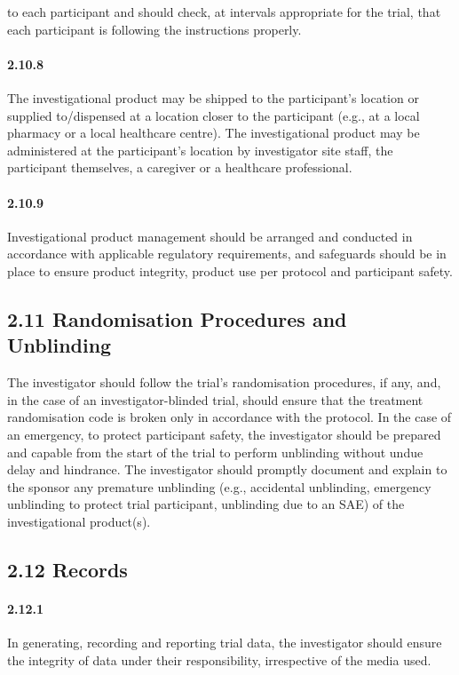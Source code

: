 \documentclass[11pt]{article}
\begin{document}
to each participant and should check, at intervals appropriate for the trial, that each participant is following the instructions properly.


\paragraph{2.10.8} The investigational product may be shipped to the participant's location or supplied to/dispensed at a location closer to the participant (e.g., at a local pharmacy or a local healthcare centre). The investigational product may be administered at the participant's location by investigator site staff, the participant themselves, a caregiver or a healthcare professional.

\paragraph{2.10.9} Investigational product management should be arranged and conducted in accordance with applicable regulatory requirements, and safeguards should be in place to ensure product integrity, product use per protocol and participant safety.

\subsection{2.11 Randomisation Procedures and Unblinding}

The investigator should follow the trial's randomisation procedures, if any, and, in the case of an investigator-blinded trial, should ensure that the treatment randomisation code is broken only in accordance with the protocol. In the case of an emergency, to protect participant safety, the investigator should be prepared and capable from the start of the trial to perform unblinding without undue delay and hindrance. The investigator should promptly document and explain to the sponsor any premature unblinding (e.g., accidental unblinding, emergency unblinding to protect trial participant, unblinding due to an SAE) of the investigational product(s).


\subsection{2.12 Records}

\paragraph{2.12.1} In generating, recording and reporting trial data, the investigator should ensure the integrity of data under their responsibility, irrespective of the media used.
\end{document}
